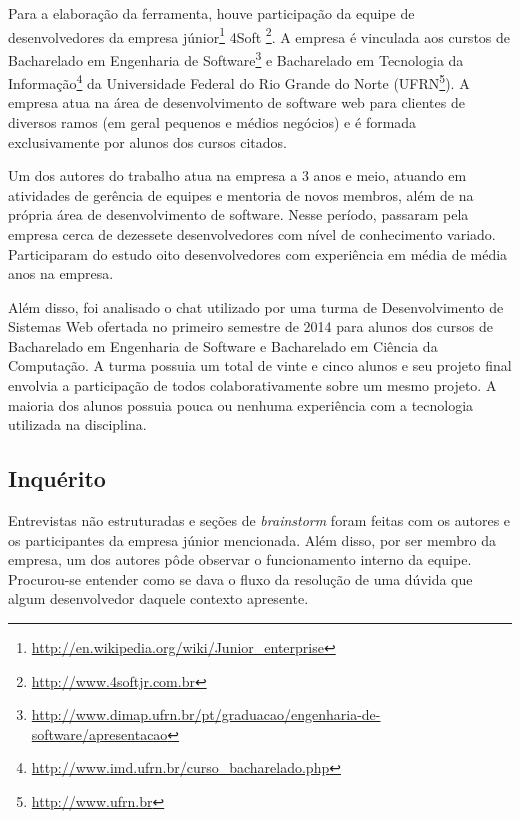 Para a elaboração da ferramenta, houve participação da equipe de desenvolvedores da empresa júnior\footnote{\url{http://en.wikipedia.org/wiki/Junior_enterprise}} 4Soft \footnote{\url{http://www.4softjr.com.br}}. A empresa é vinculada aos curstos de Bacharelado em Engenharia de Software\footnote{\url{http://www.dimap.ufrn.br/pt/graduacao/engenharia-de-software/apresentacao}} e Bacharelado em Tecnologia da Informação\footnote{\url{http://www.imd.ufrn.br/curso_bacharelado.php}} da Universidade Federal do Rio Grande do Norte (UFRN\footnote{\url{http://www.ufrn.br}}). A empresa atua na área de desenvolvimento de software web para clientes de diversos ramos (em geral pequenos e médios negócios) e é formada exclusivamente por alunos dos cursos citados.

Um dos autores do trabalho atua na empresa a 3 anos e meio, atuando em atividades de gerência de equipes e mentoria de novos membros, além de na própria área de desenvolvimento de software. Nesse período, passaram pela empresa cerca de dezessete desenvolvedores com nível de conhecimento variado. Participaram do estudo oito desenvolvedores com experiência em média de média anos na empresa.


Além disso, foi analisado o chat utilizado por uma turma de Desenvolvimento de Sistemas Web ofertada no primeiro semestre de 2014 para alunos dos cursos de Bacharelado em Engenharia de Software e Bacharelado em Ciência da Computação. A turma possuia um total de vinte e cinco alunos e seu projeto final envolvia a participação de todos colaborativamente sobre um mesmo projeto. A maioria dos alunos possuia pouca ou nenhuma experiência com a tecnologia utilizada na disciplina.


\subsection{Inquérito}

Entrevistas não estruturadas e seções de \textit{brainstorm} foram feitas com os autores e os participantes da empresa júnior mencionada. Além disso, por ser membro da empresa, um dos autores pôde observar o funcionamento interno da equipe. Procurou-se entender como se dava o fluxo da resolução de uma dúvida que algum desenvolvedor daquele contexto apresente.


